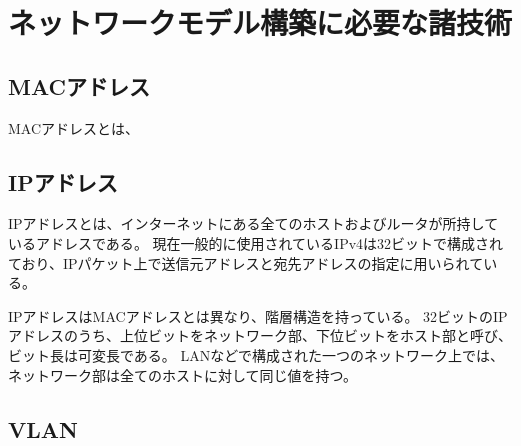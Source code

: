 \section{ネットワークモデル構築に必要な諸技術}

\subsection{MACアドレス}

MACアドレスとは、

\subsection{IPアドレス}

IPアドレスとは、インターネットにある全てのホストおよびルータが所持しているアドレスである\cite{tanenbaum}。
現在一般的に使用されているIPv4は32ビットで構成されており、IPパケット上で送信元アドレスと宛先アドレスの指定に用いられている。

IPアドレスはMACアドレスとは異なり、階層構造を持っている。
32ビットのIPアドレスのうち、上位ビットをネットワーク部、下位ビットをホスト部と呼び、ビット長は可変長である。
LANなどで構成された一つのネットワーク上では、ネットワーク部は全てのホストに対して同じ値を持つ。

\subsection{VLAN}

